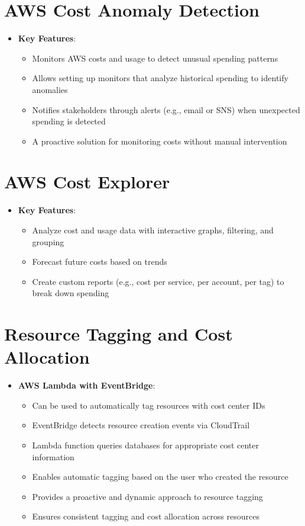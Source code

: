 \documentclass[11pt,a4paper]{report}
\begin{document}
\section{AWS Cost Anomaly Detection}

\begin{itemize}
  \item \textbf{Key Features}:
\begin{itemize}
  \item Monitors AWS costs and usage to detect unusual spending patterns
  \item Allows setting up monitors that analyze historical spending to identify anomalies
  \item Notifies stakeholders through alerts (e.g., email or SNS) when unexpected spending is detected
  \item A proactive solution for monitoring costs without manual intervention
\end{itemize}
\end{itemize}


\section{AWS Cost Explorer}

\begin{itemize}
  \item \textbf{Key Features}:
\begin{itemize}
  \item Analyze cost and usage data with interactive graphs, filtering, and grouping
  \item Forecast future costs based on trends
  \item Create custom reports (e.g., cost per service, per account, per tag) to break down spending
\end{itemize}
\end{itemize}


\section{Resource Tagging and Cost Allocation}

\begin{itemize}
  \item \textbf{AWS Lambda with EventBridge}:
\begin{itemize}
  \item Can be used to automatically tag resources with cost center IDs
  \item EventBridge detects resource creation events via CloudTrail
  \item Lambda function queries databases for appropriate cost center information
  \item Enables automatic tagging based on the user who created the resource
  \item Provides a proactive and dynamic approach to resource tagging
  \item Ensures consistent tagging and cost allocation across resources
\end{itemize}
\end{itemize}
\end{document}

